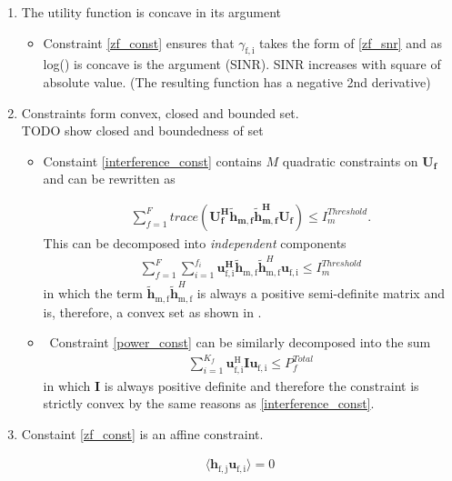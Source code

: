 \documentclass[12pt]{article}
\begin{document}
\begin{enumerate}
\item The utility function is concave in its argument 
\begin{itemize}
\item 
Constraint \eqref{zf_const}  ensures that $\gamma_{\mathrm{f,i}}$ takes the form of \eqref{zf_snr} and  as log() is concave is the argument (SINR). SINR increases with square of absolute value. (The resulting function has a negative 2nd derivative)
\end{itemize}

\item
Constraints form convex, closed and bounded set. 
\\
TODO show closed and boundedness of set

\begin{itemize}

\item
	Constaint \eqref{interference_const} contains $M$ quadratic constraints on $\mathbf{U_f}$ and 
	can be rewritten as 

\begin{gather*}
	\sum_{f=1}^F
	trace(\mathbf{U_f^H} \mathbf{\tilde{h}_{m,f}} \mathbf{\tilde{h}_{m,f}^H} \mathbf{U_f} )\leq 
	I^{Threshold}_{m}.
\end{gather*}
This can be decomposed into \textit{independent} components 
	\begin{gather*}
	\sum_{f=1}^F
	\sum_{i=1}^{f_i}
	\mathbf{u_{\mathrm{f,i}}^H}\mathbf{\tilde{h}_{\mathrm{m,f}}} \mathbf{\tilde{h}}_{\mathrm{m,f}}^H
	\mathbf{u_{\mathrm{f,i}}} \leq I^{Threshold}_{m}
	\end{gather*}
in which the term $ \mathbf{\tilde{h}_{\mathrm{m,f}}} \mathbf{\tilde{h}}_{\mathrm{m,f}}^H$ is always a positive semi-definite matrix and is, therefore, a convex set as shown in 
\cite[p.8,9]{BoV:04}. 


\item \
	Constraint \eqref{power_const} can be similarly decomposed into the sum
	\begin{gather*}
		\sum_{i=1}^{K_f}\mathbf{u_{\mathrm{f,i}}^{\mathrm{H}}} \mathbf{I} 		
		\mathbf{u_{\mathrm{f,i}}} \leq  P^{Total}_{f}
	\end{gather*}
	in which $\mathbf{I}$ is always positive definite and 			
	therefore the constraint is strictly convex by the same 		
	reasons as \eqref{interference_const}.
\end{itemize}

\item 
	Constaint \eqref{zf_const} is an affine constraint. 

		\begin{gather*}
		\langle \mathbf{h_{\mathrm{f,j}}}\mathbf{u_{\mathrm{f,i}}} \rangle =0
		\end{gather*}

\end{enumerate}
\end{document}
